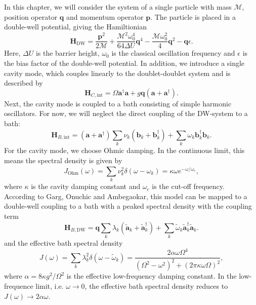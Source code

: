 In this chapter, we will consider the system of a single particle with mass $\mathcal{M}$, 
position operator $\mathbf{q}$ and momentum operator $\mathbf{p}$.
The particle is placed in a double-well potential, giving the Hamiltionian
%
\begin{equation}
    \mathbf{H}_{\text{DW}} = \frac{\mathbf{p}^2}{2 \mathcal{M}}  
    + \frac{\mathcal{M}^2 \omega_0^4}{64 \Delta U} \mathbf{q}^4 
    - \frac{\mathcal{M} \omega_0^2}{4} \mathbf{q}^2
    - \mathbf{q} \epsilon .
\end{equation}
%
Here, $\Delta U$ is the barrier height, $\omega_0$ is the classical oscillation frequency
and $\epsilon$ is the bias factor of the double-well potential.
In addition, we introduce a single cavity mode, which couples linearly to the doublet-doublet
system and is described by
%
\begin{equation}
    \mathbf{H}_{C,\text{int}} = \Omega \mathbf{a}^{\dagger} \mathbf{a}
    + g \mathbf{q} \left( \mathbf{a} + \mathbf{a}^{\dagger} \right) .
\end{equation}
%
Next, the cavity mode is coupled to a bath consisting of simple harmonic oscillators. 
For now, we will neglect the direct coupling of the DW-system to a bath:
%
\begin{equation}
    \mathbf{H}_{B,\text{int}} = \left( \mathbf{a} + \mathbf{a}^{\dagger} \right)
    \sum_{k}^{} \nu_k \left( \mathbf{b}_k + \mathbf{b}^{\dagger}_k  \right) 
    + \sum_{k}^{} \omega_k \mathbf{b}^{\dagger}_k  \mathbf{b}_k  .
\end{equation}
%
For the cavity mode, we choose Ohmic damping. In the continuous limit, this means the 
spectral density is given by
%
\begin{equation}
    J_{\text{Ohm}} \left( \omega \right) = \sum_{k}^{} \nu_k^2 \delta\left( \omega - \omega_k \right) 
    = \kappa \omega e^{- \omega / \omega_c} ,
\end{equation}
%
where $\kappa$ is the cavity damping constant and $\omega_c$ is the cut-off frequency. \\
According to Garg, Onuchic and Ambegaokar, this model can be mapped to a double-well 
coupling to a bath with a peaked spectral density with the coupling term
%
\begin{equation}
    \mathbf{H}_{B,\text{DW}} = \mathbf{q} \sum_{k}^{} \lambda_k \left( \tilde{\mathbf{a}}_k  + \tilde{\mathbf{a}}^\dagger_k  \right) 
    + \sum_{k}^{}\tilde{\omega}_k \tilde{\mathbf{a}}^\dagger_k  \tilde{\mathbf{a}}_k  .
\end{equation}
%
and the effective bath spectral density
%
\begin{equation}\label{bath_spectral_density}
    J \left( \omega \right) = \sum_{k}^{} \lambda_k^2 \delta\left( \omega - \tilde{\omega}_k \right) 
    = \frac{2 \alpha \omega \Omega^4}{ \left( \Omega^2 - \omega^2 \right)^2  + \left( 2 \pi \kappa \omega \Omega  \right)^2 } ,
\end{equation}
%
where $\alpha = 8 \kappa g^2 / \Omega^2$ is the effective low-frequency damping constant.
In the low-frequence limit, i.e. $\omega \rightarrow 0$, the effective bath spectral
density reduces to $J \left( \omega \right) \rightarrow 2 \alpha \omega$.

